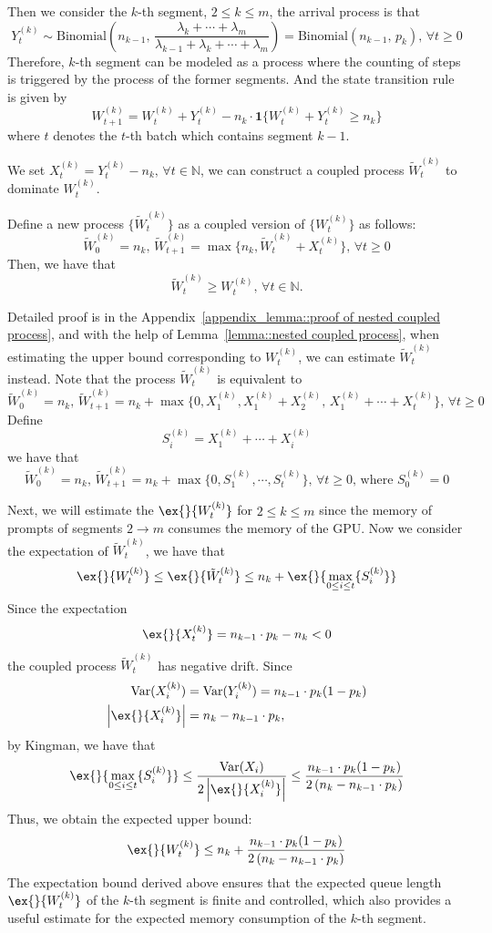 Then we consider the $k$-th segment, $2\leq k\leq m$, the arrival process is that 
$$Y_t^{(k)} \sim \text{Binomial}\left(  n_{k-1} ,\, \frac{\lambda_{k}+\cdots+\lambda_m }{\lambda_{k-1}+\lambda_k+\cdots+\lambda_m} \right) = \text{Binomial}( n_{k-1} ,\, p_k),\,\forall t \ge 0$$
Therefore, $k$-th segment can be modeled as a process where the counting of steps is triggered by the process of the former segments. And the state transition rule is given by
$$W_{t+1}^{(k)}=W_{t}^{(k)}+Y_t^{(k)} - n_{k}\cdot \mathbf{1}\{ W_{t}^{(k)}+Y_t^{(k)}\geq n_{k}  \}$$
where $t$ denotes the $t$-th batch which contains segment $k-1$.

We set $X_t^{(k)} = Y_t^{(k)} - n_{k},\,\forall t\in \mathbb{N} $, we can construct a coupled process $\tilde{W}_t^{(k)}$ to dominate $W_t^{(k)}$.
\begin{lemma}\label{lemma::nested coupled process}
Define a new process $\{ \tilde{W}_t^{(k)} \}$ as a coupled version of $\{ W_t^{(k)} \}$ as follows:
$$\tilde{W}_0^{(k)} = n_{k},\,\tilde{W}_{t+1}^{(k)}=
\max\{ n_{k},\tilde{W}_{t}^{(k)} + X_t^{(k)}\},\,\forall t\geq 0$$
Then, we have that 
$$ \tilde{W}^{(k)}_t \geq W_t^{(k)},\,\forall t\in \mathbb{N} .$$
\end{lemma}
Detailed proof is in the Appendix~\ref{appendix_lemma::proof of nested coupled process}, and with the help of Lemma~\ref{lemma::nested coupled process}, when estimating the upper bound corresponding to $W_t^{(k)}$, we can estimate $\tilde{W}_t^{(k)}$ instead. Note that the process $\tilde{W}_t^{(k)}$ is equivalent to
$$\tilde{W}_0^{(k)} = n_{k},\,\tilde{W}_{t+1}^{(k)} =n_{k}+ \max\{ 0, X_1^{(k)},X_1^{(k)}+X_2^{(k)},\, X_1^{(k)}+\cdots+X_t^{(k)} \},\,\forall t\geq 0$$
Define 
$$S_i^{(k)} = X_1^{(k)}+\cdots+X_i^{(k)}$$
we have that
$$\tilde{W}_0^{(k)} = n_{k},\,\tilde{W}_{t+1}^{(k)} =n_{k}+ \max\{ 0, S_1^{(k)} ,\cdots,S_t^{(k)}  \},\,\forall t\geq 0,\,\text{where }S_0^{(k)}=0$$

Next, we will estimate the $\ex{}{W_{t}^{(k)}}$ for $2\leq k\leq m$ since the memory of prompts of segments $2\to m$ consumes the memory of the GPU. Now we consider the expectation of $\tilde{W}_t^{(k)}$, we have that 
$$\ex{}{W_t^{(k)}}\leq \ex{}{\tilde{W}_t^{(k)}}\leq n_k+\ex{}{\max_{0\leq i\leq t}\{S_i^{(k)}\}} $$
Since the expectation
$$\ex{}{X_t^{(k)}} =  n_{k-1}\cdot p_k - n_{k}<0 $$
the coupled process $\tilde{W}_t^{(k)}$ has negative drift. Since
\begin{align*}
    \text{Var}(X_i^{(k)})&=\text{Var}(Y_i^{(k)})=n_{k-1}\cdot p_k(1-p_k)\\
    \left|\ex{}{X_i^{(k)}}\right|&= n_{k}-n_{k-1}\cdot p_k,
\end{align*}
by Kingman, we have that
$$\ex{}{\max_{0\leq i\leq t}\{S_i^{(k)}\}}  \leq  \frac{\text{Var}(X_i)}{ 2\left|\ex{}{X_i^{(k)}}\right| }\leq   \frac{n_{k-1}\cdot p_k(1-p_k)}{2\left(n_{k}-n_{k-1}\cdot p_k\right)}$$
Thus, we obtain the expected upper bound:
$$\ex{}{W_t^{(k)}}\leq n_k +\frac{n_{k-1}\cdot p_k(1-p_k)}{2\left(n_{k}-n_{k-1}\cdot p_k\right)}$$
The expectation bound derived above ensures that the expected queue length $\ex{}{W_t^{(k)}}$ of the $k$-th segment is finite and controlled, which also provides a useful estimate for the expected memory consumption of the $k$-th segment. 

